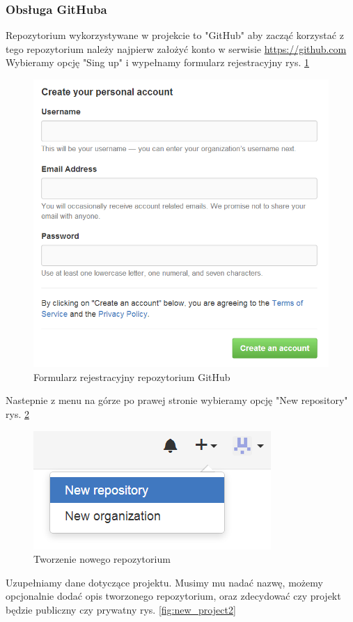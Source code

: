 \subsubsection{Obsługa GitHuba}
Repozytorium wykorzystywane w projekcie to "GitHub" aby zacząć korzystać z tego repozytorium należy najpierw założyć konto w serwisie \href{https://github.com}{https://github.com}
Wybieramy opcję "Sing up" i wypełnamy formularz rejestracyjny rys. \ref{fig:rejestracja}
\begin{figure}[H]
	\centering
	\includegraphics [width=15cm] {fig/rejestracja}
	\caption{Formularz rejestracyjny repozytorium GitHub}
	\label{fig:rejestracja}
\end{figure}
Nastepnie z menu na górze po prawej stronie wybieramy opcję "New repository" rys. \ref{fig:new_project}
\begin{figure}[H]
	\centering
	\includegraphics{fig/new_project}
	\caption{Tworzenie nowego repozytorium}
	\label{fig:new_project}
\end{figure}
Uzupełniamy dane dotyczące projektu. Musimy mu nadać nazwę, możemy opcjonalnie dodać opis tworzonego repozytorium, oraz zdecydować czy projekt będzie publiczny czy prywatny rys. \ref{fig:new_project2}

